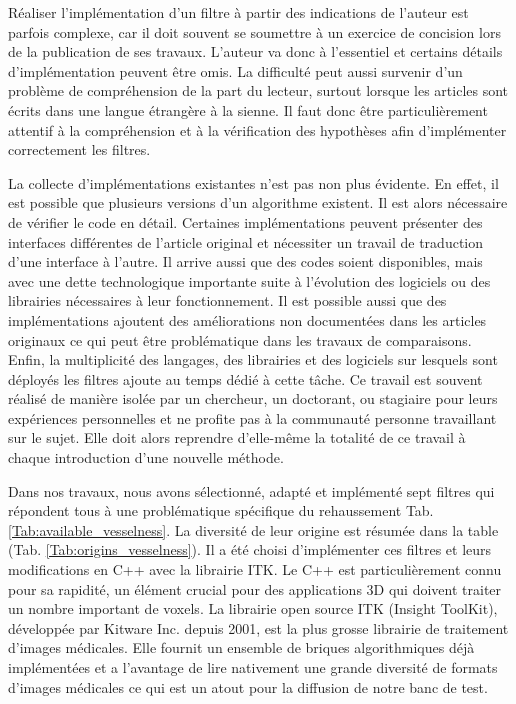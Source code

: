 Réaliser l'implémentation d'un filtre à partir des indications de l'auteur est parfois complexe, car il doit souvent se soumettre à un exercice de concision lors de la publication de ses travaux. L'auteur va donc à l'essentiel et certains détails d'implémentation peuvent être omis. La difficulté peut aussi survenir d'un problème de compréhension de la part du lecteur, surtout lorsque les articles sont écrits dans une langue étrangère à la sienne. Il faut donc être particulièrement attentif à la compréhension et à la vérification des hypothèses afin d'implémenter correctement les filtres. 

La collecte d'implémentations existantes n'est pas non plus évidente. En effet, il est possible que plusieurs versions d'un algorithme existent. Il est alors nécessaire de vérifier le code en détail. Certaines implémentations peuvent présenter des interfaces différentes de l'article original et nécessiter un travail de traduction d'une interface à l'autre. Il arrive aussi que des codes soient disponibles, mais avec une dette technologique importante suite à l'évolution des logiciels ou des librairies nécessaires à leur fonctionnement. Il est possible aussi que des implémentations ajoutent des améliorations non documentées dans les articles originaux ce qui peut être problématique dans les travaux de comparaisons. Enfin, la multiplicité des langages, des librairies et des logiciels sur lesquels sont déployés les filtres ajoute au temps dédié à cette tâche. Ce travail est souvent réalisé de manière isolée par un chercheur, un doctorant, ou stagiaire pour leurs expériences personnelles et ne profite pas à la communauté personne travaillant sur le sujet. Elle doit alors reprendre d'elle-même la totalité de ce travail à chaque introduction d'une nouvelle méthode.

Dans nos travaux, nous avons sélectionné, adapté et implémenté sept filtres qui répondent tous à une problématique spécifique du rehaussement Tab. \ref{Tab:available_vesselness}. La diversité de leur origine est résumée dans la table (Tab. \ref{Tab:origins_vesselness}). Il a été choisi d'implémenter ces filtres et leurs modifications en C++ avec la librairie ITK. Le C++ est particulièrement connu pour sa rapidité, un élément crucial pour des applications 3D qui doivent traiter un nombre important de voxels. La librairie open source ITK (Insight ToolKit), développée par Kitware Inc. depuis 2001, est la plus grosse librairie de traitement d'images médicales. Elle fournit un ensemble de briques algorithmiques déjà implémentées et a l'avantage de lire nativement une grande diversité de formats d'images médicales ce qui est un atout pour la diffusion de notre banc de test.


